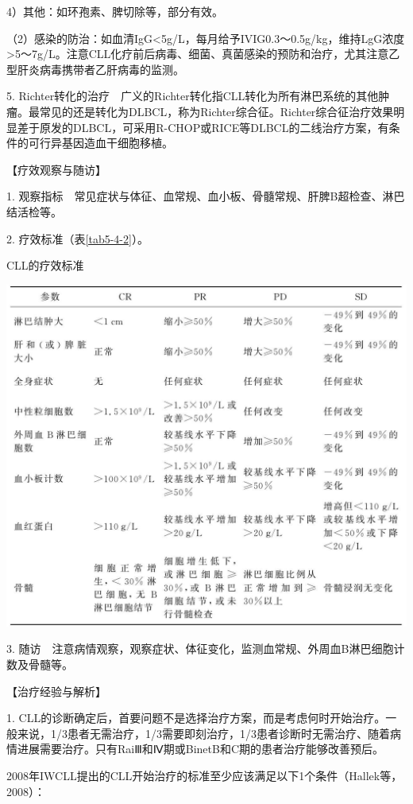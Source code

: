4）其他：如环孢素、脾切除等，部分有效。

（2）感染的防治：如血清IgG<5g/L，每月给予IVIG0.3～0.5g/kg，维持LgG浓度\textgreater{}5～7g/L。注意CLL化疗前后病毒、细菌、真菌感染的预防和治疗，尤其注意乙型肝炎病毒携带者乙肝病毒的监测。

5.
Richter转化的治疗　广义的Richter转化指CLL转化为所有淋巴系统的其他肿瘤。最常见的还是转化为DLBCL，称为Richter综合征。Richter综合征治疗效果明显差于原发的DLBCL，可采用R-CHOP或RICE等DLBCL的二线治疗方案，有条件的可行异基因造血干细胞移植。

【疗效观察与随访】

1.
观察指标　常见症状与体征、血常规、血小板、骨髓常规、肝脾B超检查、淋巴结活检等。

2. 疗效标准（表\ref{tab5-4-2}）。

\begin{table}[htbp]
\centering
\caption{CLL的疗效标准}
\label{tab5-4-2}
\includegraphics{./images/Image00157.jpg}
\end{table}

3.
随访　注意病情观察，观察症状、体征变化，监测血常规、外周血B淋巴细胞计数及骨髓等。

【治疗经验与解析】

1.
CLL的诊断确定后，首要问题不是选择治疗方案，而是考虑何时开始治疗。一般来说，1/3患者无需治疗，1/3需要即刻治疗，1/3患者诊断时无需治疗、随着病情进展需要治疗。只有RaiⅢ和Ⅳ期或BinetB和C期的患者治疗能够改善预后。

2008年IWCLL提出的CLL开始治疗的标准至少应该满足以下1个条件（Hallek等，2008）：

